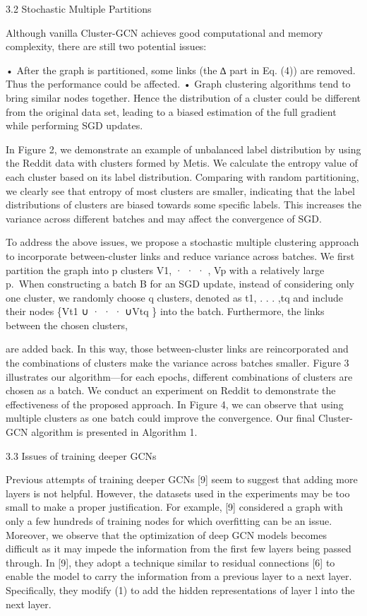 \documentclass[
]{book}
\begin{document}
{{{3.2 Stochastic Multiple Partitions

Although vanilla Cluster-GCN achieves good computational and memory complexity, there are still two potential issues:

• After the graph is partitioned, some links (the ∆ part in Eq. (4)) are removed. Thus the performance could be affected.
• Graph clustering algorithms tend to bring similar nodes together. Hence the distribution of a cluster could be different from the original data set, leading to a biased estimation of the full gradient while performing SGD updates.

In Figure 2, we demonstrate an example of unbalanced label distribution by using the Reddit data with clusters formed by Metis. We calculate the entropy value of each cluster based on its label distribution. Comparing with random partitioning, we clearly see that entropy of most clusters are smaller, indicating that the label distributions of clusters are biased towards some specific labels. This increases the variance across different batches and may affect the convergence of SGD.

To address the above issues, we propose a stochastic multiple clustering approach to incorporate between-cluster links and reduce variance across batches. We first partition the graph into p clusters V1, · · · , Vp with a relatively large p.~When constructing a batch B for an SGD update, instead of considering only one cluster, we randomly choose q clusters, denoted as t1, . . . ,tq and include their nodes \{Vt1 ∪ · · · ∪Vtq \} into the batch. Furthermore, the links between the chosen clusters,

are added back. In this way, those between-cluster links are reincorporated and the combinations of clusters make the variance across batches smaller. Figure 3 illustrates our algorithm---for each epochs, different combinations of clusters are chosen as a batch. We conduct an experiment on Reddit to demonstrate the effectiveness of the proposed approach. In Figure 4, we can observe that using multiple clusters as one batch could improve the convergence. Our final Cluster-GCN algorithm is presented in Algorithm 1.

3.3 Issues of training deeper GCNs

Previous attempts of training deeper GCNs {[}9{]} seem to suggest that adding more layers is not helpful. However, the datasets used in the experiments may be too small to make a proper justification. For example, {[}9{]} considered a graph with only a few hundreds of training nodes for which overfitting can be an issue. Moreover, we observe that the optimization of deep GCN models becomes difficult as it may impede the information from the first few layers being passed through. In {[}9{]}, they adopt a technique similar to residual connections {[}6{]} to enable the model to carry the information from a previous layer to a next layer. Specifically, they modify (1) to add the hidden representations of layer l into the next layer.

}}}
\end{document}
